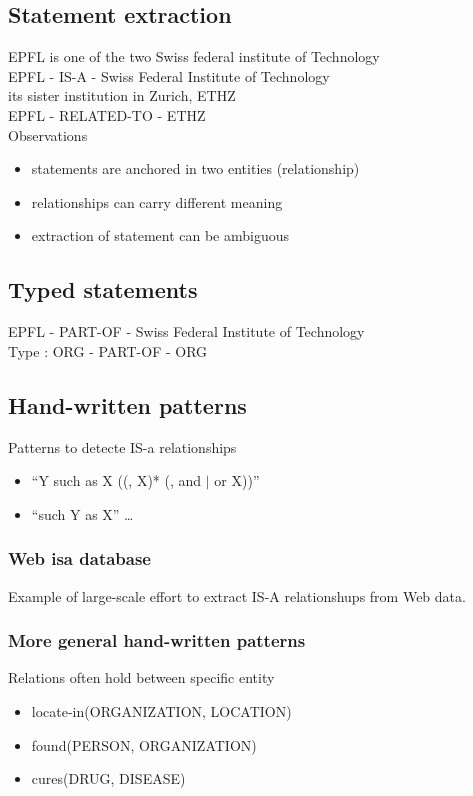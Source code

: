 \subsection{Statement extraction}
EPFL is one of the two Swiss federal institute of Technology\\
EPFL - IS-A - Swiss Federal Institute of Technology \\

its sister institution in Zurich, ETHZ \\
EPFL - RELATED-TO - ETHZ\\

Observations
\begin{itemize}
\item statements are anchored in two entities (relationship)
\item relationships can carry different meaning
\item extraction of statement can be ambiguous
\end{itemize}

\subsection{Typed statements}
EPFL - PART-OF - Swiss Federal Institute of Technology \\
Type : ORG - PART-OF - ORG \\

\subsection{Hand-written patterns}
Patterns to detecte IS-a relationships
\begin{itemize}
\item ``Y such as X ((, X)* (, and $ \mid $ or X))''
\item ``such Y as X'' \ldots
\end{itemize}

\subsubsection{Web isa database}
Example of large-scale effort to extract IS-A relationshups from Web
data.

\subsubsection{More general hand-written patterns}
Relations often hold between specific entity
\begin{itemize}
\item locate-in(ORGANIZATION, LOCATION)
\item found(PERSON, ORGANIZATION)
\item cures(DRUG, DISEASE)
\end{itemize}

